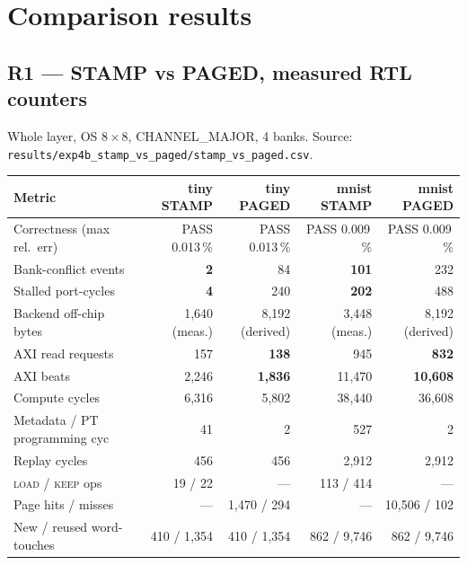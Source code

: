 \documentclass[11pt,a4paper]{article}
\newcommand{\op}[1]{\textsc{#1}}
\newcommand{\file}[1]{\texttt{\small #1}}
\begin{document}
\section{Comparison results}

\subsection{R1 --- STAMP vs PAGED, measured RTL counters}

Whole layer, OS $8\times8$, CHANNEL\_MAJOR, 4 banks. Source:
\file{results/exp4b\_stamp\_vs\_paged/stamp\_vs\_paged.csv}.

\begin{center}
\small
\begin{tabular}{@{}lrrrr@{}}
\toprule
\textbf{Metric} & \textbf{tiny STAMP} & \textbf{tiny PAGED} &
                  \textbf{mnist STAMP} & \textbf{mnist PAGED} \\
\midrule
Correctness (max rel.\ err)   & PASS 0.013\,\% & PASS 0.013\,\% & PASS 0.009\,\% & PASS 0.009\,\% \\
Bank-conflict events          & \textbf{2}   & 84    & \textbf{101}  & 232 \\
Stalled port-cycles           & \textbf{4}   & 240   & \textbf{202}  & 488 \\
Backend off-chip bytes        & 1{,}640 (meas.) & 8{,}192 (derived) & 3{,}448 (meas.) & 8{,}192 (derived) \\
AXI read requests             & 157  & \textbf{138}   & 945   & \textbf{832} \\
AXI beats                     & 2{,}246 & \textbf{1{,}836} & 11{,}470 & \textbf{10{,}608} \\
Compute cycles                & 6{,}316 & 5{,}802 & 38{,}440 & 36{,}608 \\
Metadata / PT programming cyc & 41   & 2     & 527   & 2 \\
Replay cycles                 & 456  & 456   & 2{,}912 & 2{,}912 \\
\op{load} / \op{keep} ops     & 19 / 22 & --- & 113 / 414 & --- \\
Page hits / misses            & ---  & 1{,}470 / 294 & --- & 10{,}506 / 102 \\
New / reused word-touches     & 410 / 1{,}354 & 410 / 1{,}354 & 862 / 9{,}746 & 862 / 9{,}746 \\
\bottomrule
\end{tabular}
\end{center}
\end{document}
